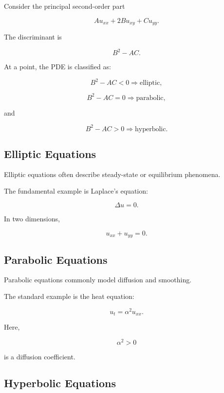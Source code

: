 Consider the principal second-order part

\[
\boxed{
A u_{xx}
+
2B u_{xy}
+
C u_{yy}.
}
\]

The discriminant is

\[
\boxed{
B^2-AC.
}
\]

At a point, the PDE is classified as:

\[
\boxed{
B^2-AC<0
\Rightarrow
\text{elliptic},
}
\]

\[
\boxed{
B^2-AC=0
\Rightarrow
\text{parabolic},
}
\]

and

\[
\boxed{
B^2-AC>0
\Rightarrow
\text{hyperbolic}.
}
\]

\subsection{Elliptic Equations}
\label{subsec:elliptic-equations}

Elliptic equations often describe steady-state or equilibrium phenomena.

The fundamental example is Laplace's equation:

\[
\boxed{
\Delta u=0.
}
\]

In two dimensions,

\[
\boxed{
u_{xx}+u_{yy}=0.
}
\]

\subsection{Parabolic Equations}
\label{subsec:parabolic-equations}

Parabolic equations commonly model diffusion and smoothing.

The standard example is the heat equation:

\[
\boxed{
u_t
=
\alpha^2u_{xx}.
}
\]

Here,

\[
\alpha^2>0
\]

is a diffusion coefficient.

\subsection{Hyperbolic Equations}
\label{subsec:hyperbolic-equations}

